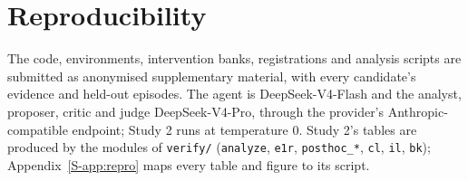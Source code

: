 \documentclass[11pt]{article}
\begin{document}
\section{Reproducibility}
\label{app:repro}
The code, environments, intervention banks, registrations and analysis scripts are submitted as anonymised supplementary material, with every candidate's evidence and held-out episodes. The agent is DeepSeek-V4-Flash and the analyst, proposer, critic and judge DeepSeek-V4-Pro, through the provider's Anthropic-compatible endpoint; Study 2 runs at temperature 0. Study 2's tables are produced by the modules of \texttt{verify/} (\texttt{analyze}, \texttt{e1r}, \texttt{posthoc\_*}, \texttt{cl}, \texttt{il}, \texttt{bk}); Appendix~\ref*{S-app:repro} maps every table and figure to its script.
\end{document}
